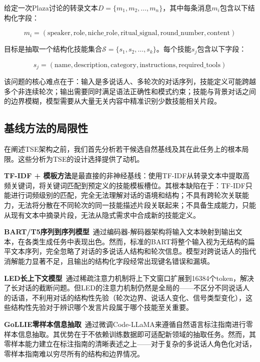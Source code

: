 \documentclass[conference]{IEEEtran}
\begin{document}
给定一次Plaza讨论的转录文本$D = \{m_1, m_2, \ldots, m_n\}$，其中每条消息$m_i$包含以下结构化字段：

\begin{equation}
m_i = (\text{speaker}, \text{role}, \text{niche\_role}, \text{ritual\_signal}, \text{round\_number}, \text{content})
\label{eq:message}
\end{equation}

目标是抽取一个结构化技能集合$\mathcal{S} = \{s_1, s_2, \ldots, s_k\}$。每个技能$s_j$包含以下字段：

\begin{equation}
s_j = (\text{name}, \text{description}, \text{category}, \text{instructions}, \text{required\_tools})
\label{eq:skill_struct}
\end{equation}

该问题的核心难点在于：输入是多说话人、多轮次的对话序列，技能定义可能跨越多个非连续轮次；输出需要同时满足语法正确性和模式约束；技能与背景对话之间的边界模糊，模型需要从大量无关内容中精准识别少数技能相关片段。

\subsection{基线方法的局限性}

在阐述TSE架构之前，我们首先分析若干候选自然基线及其在此任务上的根本局限。这些分析为TSE的设计选择提供了动机。

\textbf{TF-IDF + 模板方法}是最直接的非神经基线：使用TF-IDF从转录文本中提取高频关键词，将关键词匹配到预定义的技能模板槽位。其根本缺陷在于：TF-IDF只能进行词频级别的匹配，完全无法理解对话的语境和结构；不具有跨轮次关联能力，无法将分散在不同轮次的同一技能描述片段关联起来；不具备生成能力，只能从现有文本中摘录片段，无法从隐式需求中合成新的技能定义。

\textbf{BART/T5序列到序列模型}~\cite{lewis2019bart}通过编码器-解码器架构将输入文本映射到输出文本，在各类生成任务中表现出色。然而，标准的BART将整个输入视为无结构的扁平文本序列，完全忽略了对话的多说话人结构和轮次信息。模型对跨说话人的指代消解能力显著不足，且输出的结构化字段经常出现键名错误和漏填。

\textbf{LED长上下文模型}~\cite{beltagy2020longformer}通过稀疏注意力机制将上下文窗口扩展到16384个token，解决了长对话的截断问题。但LED的注意力机制仍然是全局的——不区分不同说话人的话语，不利用对话的结构性先验（轮次边界、说话人变化、信号类型变化），这些结构性先验对于辨识哪个发言片段属于哪个技能至关重要。

\textbf{GoLLIE零样本信息抽取}~\cite{sainz2023gollie}通过微调Code-LLaMA来遵循自然语言标注指南进行零样本信息抽取。其优势在于不依赖训练数据即可适配新领域的抽取任务。然而，其零样本能力建立在标注指南的清晰表述之上——对于复杂的多说话人角色化对话，零样本指南难以穷尽所有的结构和边界情况。
\end{document}
